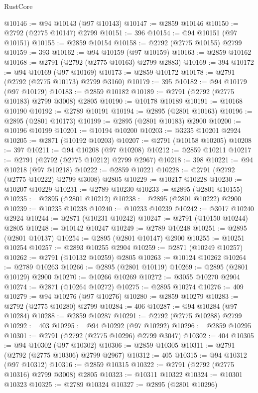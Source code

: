 \begin{lexlean}{RustCore}
\begin{coremodule}
@10146 := @94 @10143 (@97 @10143)
@10147 := @2859 @10146
@10150 := @2792 (@2775 @10147) @2799
@10151 := 396
@10154 := @94 @10151 (@97 @10151)
@10155 := @2859 @10154
@10158 := @2792 (@2775 @10155) @2799
@10159 := 393
@10162 := @94 @10159 (@97 @10159)
@10163 := @2859 @10162
@10168 := @2791 (@2792 (@2775 @10163) @2799 @2883)
@10169 := 394
@10172 := @94 @10169 (@97 @10169)
@10173 := @2859 @10172
@10178 := @2791 (@2792 (@2775 @10173) @2799 @3160)
@10179 := 395
@10182 := @94 @10179 (@97 @10179)
@10183 := @2859 @10182
@10189 := @2791 (@2792 (@2775 @10183) @2799 @3008) @2805
@10190 := @10178 @10189
@10191 := @10168 @10190
@10192 := @2789 @10191
@10194 := @2895 (@2801 @10163)
@10196 := @2895 (@2801 @10173)
@10199 := @2895 (@2801 @10183) @2900
@10200 := @10196 @10199
@10201 := @10194 @10200
@10203 := @3235 @10201 @2924
@10205 := @2871 (@10192 @10203)
@10207 := @2791 (@10158 @10205)
@10208 := 397
@10211 := @94 @10208 (@97 @10208)
@10212 := @2859 @10211
@10217 := @2791 (@2792 (@2775 @10212) @2799 @2967)
@10218 := 398
@10221 := @94 @10218 (@97 @10218)
@10222 := @2859 @10221
@10228 := @2791 (@2792 (@2775 @10222) @2799 @3008) @2805
@10229 := @10217 @10228
@10230 := @10207 @10229
@10231 := @2789 @10230
@10233 := @2895 (@2801 @10155)
@10235 := @2895 (@2801 @10212)
@10238 := @2895 (@2801 @10222) @2900
@10239 := @10235 @10238
@10240 := @10233 @10239
@10242 := @3017 @10240 @2924
@10244 := @2871 (@10231 @10242)
@10247 := @2791 (@10150 @10244) @2805
@10248 := @10142 @10247
@10249 := @2789 @10248
@10251 := @2895 (@2801 @10137)
@10254 := @2895 (@2801 @10147) @2900
@10255 := @10251 @10254
@10257 := @2893 @10255 @2904
@10259 := @2871 (@10249 @10257)
@10262 := @2791 (@10132 @10259) @2805
@10263 := @10124 @10262
@10264 := @2789 @10263
@10266 := @2895 (@2801 @10119)
@10269 := @2895 (@2801 @10129) @2900
@10270 := @10266 @10269
@10272 := @3055 @10270 @2904
@10274 := @2871 (@10264 @10272)
@10275 := @2895 @10274
@10276 := 409
@10279 := @94 @10276 (@97 @10276)
@10280 := @2859 @10279
@10283 := @2792 (@2775 @10280) @2799
@10284 := 406
@10287 := @94 @10284 (@97 @10284)
@10288 := @2859 @10287
@10291 := @2792 (@2775 @10288) @2799
@10292 := 403
@10295 := @94 @10292 (@97 @10292)
@10296 := @2859 @10295
@10301 := @2791 (@2792 (@2775 @10296) @2799 @3047)
@10302 := 404
@10305 := @94 @10302 (@97 @10302)
@10306 := @2859 @10305
@10311 := @2791 (@2792 (@2775 @10306) @2799 @2967)
@10312 := 405
@10315 := @94 @10312 (@97 @10312)
@10316 := @2859 @10315
@10322 := @2791 (@2792 (@2775 @10316) @2799 @3008) @2805
@10323 := @10311 @10322
@10324 := @10301 @10323
@10325 := @2789 @10324
@10327 := @2895 (@2801 @10296)

\end{coremodule}
\end{lexlean}

